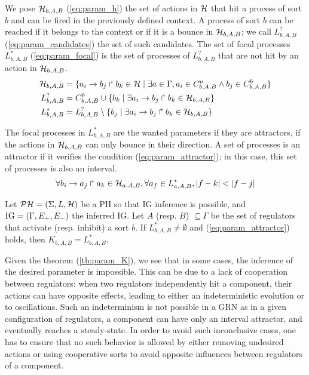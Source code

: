 We pose $\mathcal{H}_{b,A,B}$ (\eqref{eq:param_h}) the set of actions in $\mathcal{H}$ that hit a process of sort $b$ and can be fired in the previously defined context. A process of sort $b$ can be reached if it belongs to the context or if it is a bounce in $\mathcal{H}_{b,A,B}$; we call $L_{b,A,B}^?$ (\ref{eq:param_candidates}) the set of such candidates. The set of focal processes $L_{b,A,B}^*$ (\ref{eq:param_focal}) is the set of processes of $L_{b,A,B}^?$ that are not hit by an action in $\mathcal{H}_{b,A,B}$.
\begin{align}
\label{eq:param_h}
  \mathcal{H}_{b,A,B} & = \{ a_i\rightarrow b_j\Rsh b_k \in \mathcal{H} \mid \exists a \in \Gamma, a_i \in C_{b,A,B}^a \wedge b_j \in C_{b,A,B}^b\}
\\
\label{eq:param_candidates}
  L_{b,A,B}^? & =  C_{b,A,B}^b \cup \{ b_k\mid \exists a_i\rightarrow b_j\Rsh b_k \in \mathcal{H}_{b,A,B}\}
\\
\label{eq:param_focal}
  L_{b,A,B}^* & =  L_{b,A,B}^? \setminus \{ b_j \mid \exists a_i\rightarrow b_j\Rsh b_k \in \mathcal{H}_{b,A,B} \}
\end{align}

The focal processes in $L_{b,A,B}^*$ are the wanted parameters if they are attractors, \ie if the actions in $\mathcal{H}_{b,A,B}$ can only bounce in their direction. A set of processes is an attractor if it verifies the condition (\ref{eq:param_attractor}); in this case, this set of processes is also an interval.
\begin{align}
\label{eq:param_attractor}
  \forall b_i\rightarrow a_j\Rsh a_k \in \mathcal{H}_{a,A,B}, \forall a_f \in L_{a,A,B}^*, |f-k| < |f-j|
\end{align}

\begin{theorem}
\label{th:param_K}
Let $\mathcal{PH} = (\Sigma, L, \mathcal{H})$ be a PH so that IG inference is possible, and $\mathrm{IG} = (\Gamma, E_+, E_-)$ the inferred IG.
Let $A$ (resp. $B$) $\subseteq \Gamma$ be the set of regulators that activate (resp. inhibit) a sort $b$.
If $L_{b,A,B}^* \neq \emptyset$ and (\ref{eq:param_attractor}) holds, then $K_{b,A,B} = L_{b,A,B}^*$.
\end{theorem}


Given the theorem (\ref{th:param_K}), we see that in some cases, the inference of the desired parameter is impossible. This can be due to a lack of cooperation between regulators: when two regulators independently hit a component, their actions can have opposite effects, leading to either an indeterministic evolution or to oscillations. Such an indeterminism is not possible in a GRN as in a given configuration of regulators, a component can have only an interval attractor, and eventually reaches a steady-state. In order to avoid such inconclusive cases, one has to ensure that no such behavior is allowed by either removing undesired actions or using cooperative sorts to avoid opposite influences between regulators of a component.

